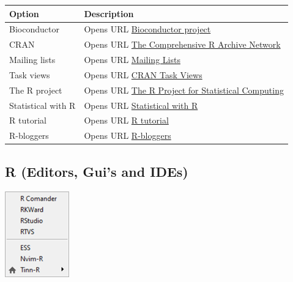 \begin{scriptsize}
  \begin{tabularx}{\textwidth}{>{\hsize=0.3\hsize}X>{\hsize=0.7\hsize}X}\\
    \hline
    \textbf{Option} & \textbf{Description} \\
    \hline
    Bioconductor & Opens URL \href{http://www.bioconductor.org/}{Bioconductor project} \\
    CRAN & Opens URL \href{http://cran.r-project.org/}{The Comprehensive R Archive Network} \\
    Mailing lists & Opens URL \href{https://www.r-project.org/mail.html}{Mailing Lists} \\
    Task views & Opens URL \href{http://cran.r-project.org/web/views/}{CRAN Task Views} \\
    The R project & Opens URL \href{http://www.r-project.org}{The R Project for Statistical Computing} \\
    \hdashline[1pt/1pt]
    Statistical with R & Opens URL \href{http://zoonek2.free.fr/UNIX/48\_R/all.html}{Statistical with R} \\
    R tutorial & Opens URL \href{http://www.r-tutor.com/}{R tutorial} \\
    \hdashline[1pt/1pt]
    R-bloggers & Opens URL \href{https://www.r-bloggers.com/}{R-bloggers} \\
    \hline
  \end{tabularx}
\end{scriptsize}


\hypertarget{menu_web_rguis}{}
\subsection{R (Editors, Gui's and IDEs)}

\includegraphics[scale=0.50]{./res/menu_web_rguis.png}\\

